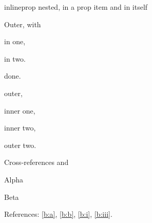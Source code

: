 \documentclass{beamer}
\begin{document}
\begin{frame}{inlineprop nested, in a prop item and in itself}
\begin{prop}
  \item<1-> Outer, with \begin{inlineprop}\item<2-> in one,
  \item<3-> in two.\end{inlineprop} done.
\end{prop}
\begin{inlineprop}\item<1-> outer, \begin{inlineprop}\item<2-> inner one,
\item<3-> inner two,\end{inlineprop} \item<4-> outer two.\end{inlineprop}
\end{frame}

\begin{frame}{Cross-references and \texttt{\string\pause}}
\begin{prop}
  \item Alpha \label{b:a} \pause
  \item Beta \label{b:b}
\end{prop}
References: \ref{b:a}, \ref{b:b}, \ref{b:i}, \ref{b:iii}.
\end{frame}
\end{document}
